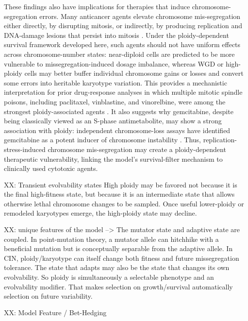 \documentclass[11pt]{article}
\begin{document}
These findings also have implications for therapies that induce chromosome-segregation errors. Many anticancer agents elevate chromosome mis-segregation either directly, by disrupting mitosis, or indirectly, by producing replication and DNA-damage lesions that persist into mitosis \cite{lee_effects_2016,zasadil_cytotoxicity_2014,scribano_chromosomal_2021,pedersen_topbp1_2015,chan_replication_2009,minocherhomji_replication_2015,beeharry_centromere_2013}. Under the ploidy-dependent survival framework developed here, such agents should not have uniform effects across chromosome-number states: near-diploid cells are predicted to be more vulnerable to missegregation-induced dosage imbalance, whereas WGD or high-ploidy cells may better buffer individual chromosome gains or losses and convert some errors into heritable karyotype variation. This provides a mechanistic interpretation for prior drug-response analyses in which multiple mitotic spindle poisons, including paclitaxel, vinblastine, and vinorelbine, were among the strongest ploidy-associated agents \cite{kimmel_integrating_2020}. It also suggests why gemcitabine, despite being classically viewed as an S-phase antimetabolite, may show a strong association with ploidy: independent chromosome-loss assays have identified gemcitabine as a potent inducer of chromosome instability \cite{lee_effects_2016}. Thus, replication-stress-induced chromosome mis-segregation may create a ploidy-dependent therapeutic vulnerability, linking the model’s survival-filter mechanism to clinically used cytotoxic agents.

XX: Transient evolvability states
     High ploidy may be favored not because it is the final high-fitness state, but because it is an intermediate state that allows otherwise lethal chromosome changes to be sampled. Once useful lower-ploidy or
     remodeled karyotypes emerge, the high-ploidy state may decline.     

XX: unique features of the model --> The mutator state and adaptive state are coupled.
     In point-mutation theory, a mutator allele can hitchhike with a beneficial mutation but is conceptually separable from the adaptive allele. In CIN, ploidy/karyotype can itself change both fitness and future
     missegregation tolerance. The state that adapts may also be the state that changes its own evolvability. So ploidy is simultaneously a selectable phenotype and an evolvability modifier. That makes selection on growth/survival automatically selection on future variability.

     
XX:  Model Feature / Bet-Hedging
\end{document}
